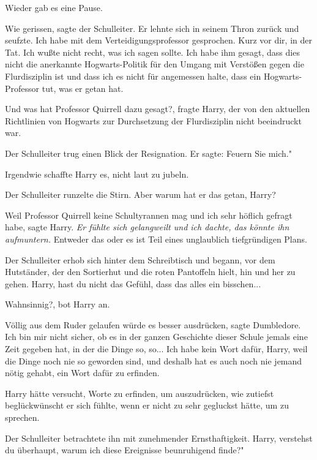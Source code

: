 Wieder gab es eine Pause.

\glqq{}Wie gerissen\grqq{}, sagte der Schulleiter. Er lehnte sich in seinem Thron
zurück und seufzte. \glqq{}Ich habe mit dem Verteidigungsprofessor gesprochen.
Kurz vor dir, in der Tat. Ich wußte nicht recht, was ich sagen sollte. Ich habe
ihm gesagt, dass dies nicht die anerkannte Hogwarts-Politik für den Umgang mit
Verstößen gegen die Flurdisziplin ist und dass ich es nicht für angemessen
halte, dass ein Hogwarts-Professor tut, was er getan hat.\grqq{}

\glqq{}Und was hat Professor Quirrell dazu gesagt?\grqq{}, fragte Harry, der von
den aktuellen Richtlinien von Hogwarts zur Durchsetzung der Flurdisziplin nicht
beeindruckt war.

Der Schulleiter trug einen Blick der Resignation. \glqq{}Er sagte: Feuern Sie
mich."

Irgendwie schaffte Harry es, nicht laut zu jubeln.

Der Schulleiter runzelte die Stirn. \glqq{}Aber warum hat er das getan,
Harry?\grqq{}

\glqq{}Weil Professor Quirrell keine Schultyrannen mag und ich sehr höflich
gefragt habe\grqq{}, sagte Harry. \emph{Er fühlte sich gelangweilt und ich
dachte, das könnte ihn aufmuntern.} \glqq{}Entweder das oder es ist Teil eines
unglaublich tiefgründigen Plans.\grqq{}

Der Schulleiter erhob sich hinter dem Schreibtisch und begann, vor dem
Hutständer, der den Sortierhut und die roten Pantoffeln hielt, hin und her zu
gehen. \glqq{}Harry, hast du nicht das Gefühl, dass das alles ein
bisschen...\grqq{}

\glqq{}Wahnsinnig?\grqq{}, bot Harry an.

\glqq{}Völlig aus dem Ruder gelaufen würde es besser ausdrücken\grqq{}, sagte
Dumbledore. \glqq{}Ich bin mir nicht sicher, ob es in der ganzen Geschichte
dieser Schule jemals eine Zeit gegeben hat, in der die Dinge so, so... Ich habe
kein Wort dafür, Harry, weil die Dinge noch nie so geworden sind, und deshalb
hat es auch noch nie jemand nötig gehabt, ein Wort dafür zu erfinden.\grqq{}

Harry hätte versucht, Worte zu erfinden, um auszudrücken, wie zutiefst
beglückwünscht er sich fühlte, wenn er nicht zu sehr gegluckst hätte, um zu
sprechen.

Der Schulleiter betrachtete ihn mit zunehmender Ernsthaftigkeit. \glqq{}Harry,
verstehst du überhaupt, warum ich diese Ereignisse beunruhigend finde?"

